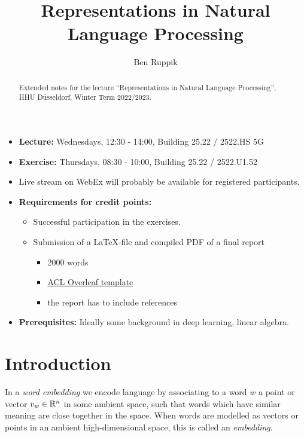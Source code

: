 \documentclass[11pt, a4paper]{amsart}
\title{Representations in Natural Language Processing}
\author{Ben Ruppik}
\begin{document}
\begin{abstract}
    Extended notes for the lecture ``Representations in Natural Language Processing'', HHU D{\"u}sseldorf, Winter Term 2022/2023.
\end{abstract}

\maketitle

\begin{itemize}
    \item \textbf{Lecture:} Wednesdays, 12:30 - 14:00, Building 25.22 / 2522.HS 5G
    \item \textbf{Exercise:} Thursdays, 08:30 - 10:00, Building 25.22 / 2522.U1.52
    \item Live stream on WebEx will probably be available for registered participants.
    \item \textbf{Requirements for credit points:}
    \begin{itemize}
        \item Successful participation in the exercises.
        \item Submission of a  \LaTeX-file and compiled PDF of a final report 
        \begin{itemize}
        	\item 2000 words
        	\item \href{https://www.overleaf.com/latex/templates/acl-2020-proceedings-template/zsrkcwjptpcd}{ACL Overleaf template}
        	\item the report has to include references
        \end{itemize}
    \end{itemize}
    \item \textbf{Prerequisites:}
    Ideally some background in deep learning,
    linear algebra.
\end{itemize}

\clearpage
\section{Introduction}
\label{sec:intro}

In a \emph{word embedding} we encode language by associating to a word $w$ a point or vector $v_{w} \in \mathbb{R}^{n}$ in some ambient space, such that words which have similar meaning are close together in the space.
When words are modelled as vectors or points in an ambient high-dimensional space, this is called an \emph{embedding}.
\end{document}
